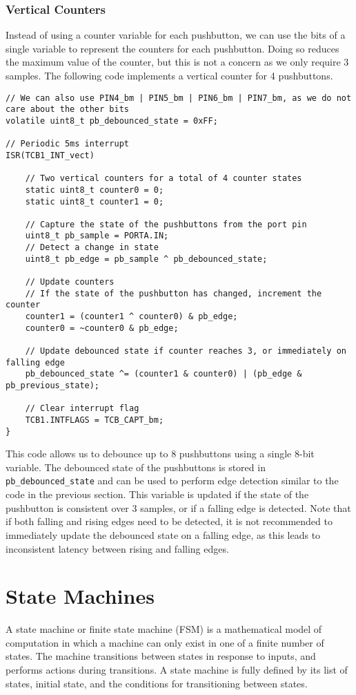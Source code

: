 \documentclass{article}
\begin{document}
\subsubsection{Vertical Counters}
Instead of using a counter variable for each pushbutton, we can use the
bits of a single variable to represent the counters for each
pushbutton. Doing so reduces the maximum value of the counter, but this
is not a concern as we only require 3 samples. The following code
implements a vertical counter for 4 pushbuttons.
\begin{verbatim}
// We can also use PIN4_bm | PIN5_bm | PIN6_bm | PIN7_bm, as we do not care about the other bits
volatile uint8_t pb_debounced_state = 0xFF;

// Periodic 5ms interrupt
ISR(TCB1_INT_vect)

    // Two vertical counters for a total of 4 counter states
    static uint8_t counter0 = 0;
    static uint8_t counter1 = 0;

    // Capture the state of the pushbuttons from the port pin
    uint8_t pb_sample = PORTA.IN;
    // Detect a change in state
    uint8_t pb_edge = pb_sample ^ pb_debounced_state;

    // Update counters
    // If the state of the pushbutton has changed, increment the counter
    counter1 = (counter1 ^ counter0) & pb_edge;
    counter0 = ~counter0 & pb_edge;

    // Update debounced state if counter reaches 3, or immediately on falling edge
    pb_debounced_state ^= (counter1 & counter0) | (pb_edge & pb_previous_state);

    // Clear interrupt flag
    TCB1.INTFLAGS = TCB_CAPT_bm;
}
\end{verbatim}
This code allows us to debounce up to 8 pushbuttons using a single
8-bit variable. The debounced state of the pushbuttons is stored in
\texttt{pb_debounced_state} and can be used to perform edge
detection similar to the code in the previous section. This variable is
updated if the state of the pushbutton is consistent over 3 samples, or
if a falling edge is detected. Note that if both falling and rising
edges need to be detected, it is not recommended to immediately update
the debounced state on a falling edge, as this leads to inconsistent
latency between rising and falling edges.
\section{State Machines}
A state machine or finite state machine (FSM) is a mathematical model
of computation in which a machine can only exist in one of a finite
number of states. The machine transitions between states in response to
inputs, and performs actions during transitions. A state machine is
fully defined by its list of states, initial state, and the conditions
for transitioning between states.
\end{document}
